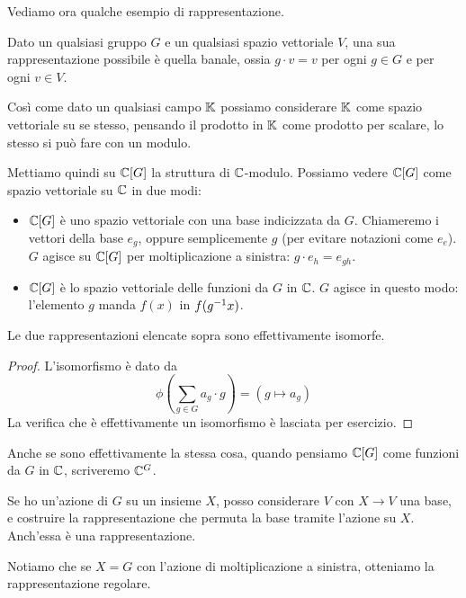 	Vediamo ora qualche esempio di rappresentazione.

	\begin{myexample}
		Dato un qualsiasi gruppo $G$ e un qualsiasi spazio vettoriale $V$, una sua rappresentazione possibile è quella banale, ossia  $g\cdot v = v$ per ogni $g\in G$ e per ogni $v\in V$.
	\end{myexample}
	\begin{myexample}
		Così come dato un qualsiasi campo $\mathbb K$ possiamo considerare $\mathbb K$ come spazio vettoriale su se stesso, pensando il prodotto in $\mathbb K$ come prodotto per scalare, lo stesso si può fare con un modulo.
		
		Mettiamo quindi su $\mathbb C[G]$ la struttura di $\mathbb C$-modulo. Possiamo vedere $\mathbb C[G]$ come spazio vettoriale su $\mathbb C$ in due modi:
		\begin{itemize}
		 \item $\mathbb C[G]$ è uno spazio vettoriale con una base indicizzata da $G$. Chiameremo i vettori della base $e_g$, oppure semplicemente $g$ (per evitare notazioni come $e_e$). $G$ agisce su $\mathbb C[G]$ per moltiplicazione a sinistra: $g\cdot e_h = e_{gh}$.
		 \item $\mathbb C[G]$ è lo spazio vettoriale delle funzioni da $G$ in $\mathbb C$. $G$ agisce in questo modo: l'elemento $g$ manda $f(x)$ in $f(g^{-1} x)$.
		\end{itemize}
		
		\begin{myprop}
		 Le due rappresentazioni elencate sopra sono effettivamente isomorfe.
		\end{myprop}
		\begin{proof}
		 L'isomorfismo è dato da \[\phi\left(\sum_{g\in G} a_g\cdot g\right)= \left(g\mapsto a_g\right)\]
		 La verifica che è effettivamente un isomorfismo è lasciata per esercizio.
		\end{proof}

		Anche se sono effettivamente la stessa cosa, quando pensiamo $\mathbb C[G]$ come funzioni da $G$ in $\mathbb C$, scriveremo $\mathbb C^{G}$.
		
	\end{myexample}
	\begin{myexample}
		Se ho un'azione di $G$ su un insieme $X$, posso considerare $V$ con $X\rightarrow V$ una base, e costruire la rappresentazione che permuta la base tramite l'azione su $X$. Anch'essa è una rappresentazione.
		
		Notiamo che se $X=G$ con l'azione di moltiplicazione a sinistra, otteniamo la rappresentazione regolare.
	\end{myexample}


